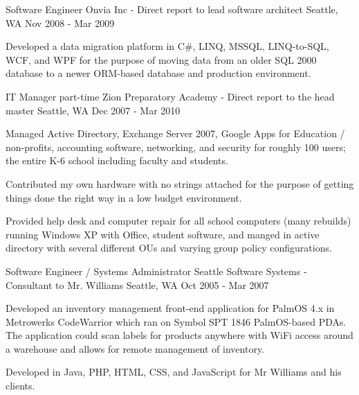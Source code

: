 \begin{cventries}
    \cventry
    {Software Engineer}
    {Onvia Inc - Direct report to lead software architect}
    {Seattle, WA}
    {Nov 2008 - Mar 2009}
    {
        \begin{cvitems}
        \item {Developed a data migration platform in C\#, LINQ, MSSQL, LINQ-to-SQL, WCF, and WPF for the purpose of moving data from an older SQL 2000 database to a newer ORM-based database and production environment.}
        \end{cvitems}
    }

    \cventry
    {IT Manager part-time} 
    {Zion Preparatory Academy - Direct report to the head master} 
    {Seattle, WA} 
    {Dec 2007 - Mar 2010} 
    { 
        \begin{cvitems}
        \item {Managed Active Directory, Exchange Server 2007, Google Apps for Education / non-profits, accounting software, networking, and security for roughly 100 users; the entire K-6 school including faculty and students.}
        \item {Contributed my own hardware with no strings attached for the purpose of getting things done the right way in a low budget environment.}
        \item {Provided help desk and computer repair for all school computers (many rebuilds) running Windows XP with Office, student software, and manged in active directory with several different OUs and varying group policy configurations.}
        \end{cvitems}
    }

    \cventry
    {Software Engineer / Systems Administrator}
    {Seattle Software Systems - Consultant to Mr. Williams} 
    {Seattle, WA} 
    {Oct 2005 - Mar 2007} 
    { 
        \begin{cvitems}
        \item {Developed an inventory management front-end application for PalmOS 4.x in Metrowerks CodeWarrior which ran on Symbol SPT 1846 PalmOS-based PDAs. The application could scan labels for products anywhere with WiFi access around a warehouse and allows for remote management of inventory.}
        \item {Developed in Java, PHP, HTML, CSS, and JavaScript for Mr Williams and his clients.}
        \end{cvitems}
    }

\end{cventries}
